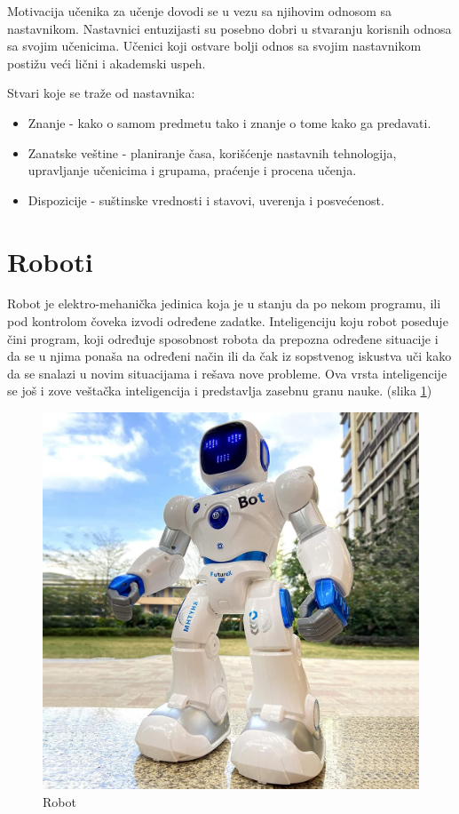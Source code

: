 \documentclass[a4paper]{article}
\begin{document}
Motivacija učenika za učenje dovodi se u vezu sa njihovim odnosom sa nastavnikom. Nastavnici entuzijasti su posebno dobri u stvaranju korisnih odnosa sa svojim učenicima. Učenici koji ostvare bolji odnos sa svojim nastavnikom postižu veći lični i akademski uspeh.

Stvari koje se traže od nastavnika:
\begin{itemize}
\item{} Znanje - kako o samom predmetu tako i znanje o tome kako ga predavati.
\item{} Zanatske veštine - planiranje časa, korišćenje nastavnih tehnologija, upravljanje učenicima i grupama, praćenje i procena učenja.
\item{} Dispozicije - suštinske vrednosti i stavovi, uverenja i posvećenost.
\end{itemize}


\newpage
\section{Roboti}
\label{sec:naslov3}

Robot je elektro-mehanička jedinica koja je u stanju da po nekom programu, ili pod kontrolom čoveka izvodi određene zadatke. Inteligenciju koju robot poseduje čini program, koji određuje sposobnost robota da prepozna određene situacije i da se u njima ponaša na određeni način ili da čak iz sopstvenog iskustva uči kako da se snalazi u novim situacijama i rešava nove probleme. Ova vrsta inteligencije se još i zove veštačka inteligencija i predstavlja zasebnu granu nauke. (slika \ref{fig:robot})

\begin{figure}[ht!]
\begin{center}
\includegraphics[scale=0.15]{robot1.jpg}
\end{center}
\caption{Robot}
\label{fig:robot}
\end{figure}
\end{document}

